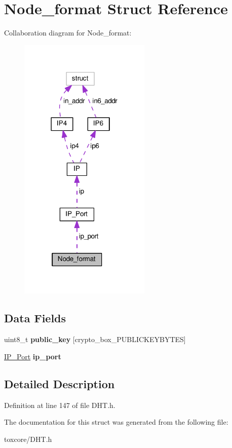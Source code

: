 \hypertarget{struct_node__format}{\section{Node\+\_\+format Struct Reference}
\label{struct_node__format}
}


Collaboration diagram for Node\+\_\+format\+:\nopagebreak
\begin{figure}[H]
\begin{center}
\leavevmode
\includegraphics[width=178pt]{struct_node__format__coll__graph}
\end{center}
\end{figure}
\subsection*{Data Fields}
\begin{DoxyCompactItemize}
\item 
\hypertarget{struct_node__format_aaa806bb1136fb3d4b5d8d8970b596ff7}{uint8\+\_\+t {\bfseries public\+\_\+key} \mbox{[}crypto\+\_\+box\+\_\+\+P\+U\+B\+L\+I\+C\+K\+E\+Y\+B\+Y\+T\+E\+S\mbox{]}}\label{struct_node__format_aaa806bb1136fb3d4b5d8d8970b596ff7}

\item 
\hypertarget{struct_node__format_a86e2a5a56c0dd22df6e8b8a10e40f9e4}{\hyperlink{struct_i_p___port}{I\+P\+\_\+\+Port} {\bfseries ip\+\_\+port}}\label{struct_node__format_a86e2a5a56c0dd22df6e8b8a10e40f9e4}

\end{DoxyCompactItemize}


\subsection{Detailed Description}


Definition at line 147 of file D\+H\+T.\+h.



The documentation for this struct was generated from the following file\+:\begin{DoxyCompactItemize}
\item 
toxcore/D\+H\+T.\+h\end{DoxyCompactItemize}
